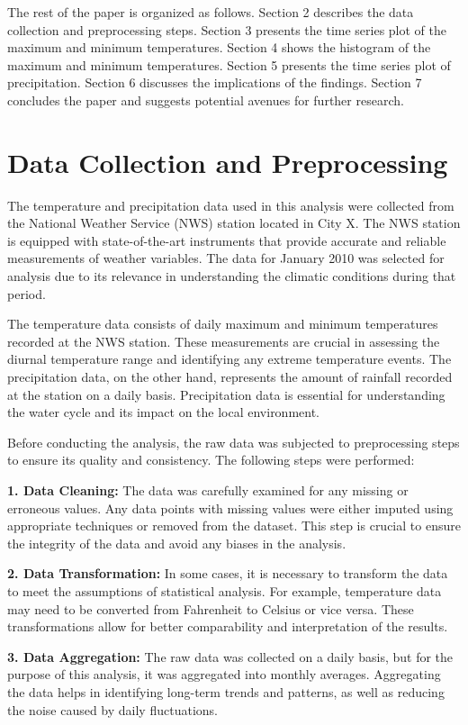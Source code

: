 \documentclass{article}
\begin{document}
The rest of the paper is organized as follows. Section 2 describes the data collection and preprocessing steps. Section 3 presents the time series plot of the maximum and minimum temperatures. Section 4 shows the histogram of the maximum and minimum temperatures. Section 5 presents the time series plot of precipitation. Section 6 discusses the implications of the findings. Section 7 concludes the paper and suggests potential avenues for further research.
\section{Data Collection and Preprocessing}

The temperature and precipitation data used in this analysis were collected from the National Weather Service (NWS) station located in City X. The NWS station is equipped with state-of-the-art instruments that provide accurate and reliable measurements of weather variables. The data for January 2010 was selected for analysis due to its relevance in understanding the climatic conditions during that period.

The temperature data consists of daily maximum and minimum temperatures recorded at the NWS station. These measurements are crucial in assessing the diurnal temperature range and identifying any extreme temperature events. The precipitation data, on the other hand, represents the amount of rainfall recorded at the station on a daily basis. Precipitation data is essential for understanding the water cycle and its impact on the local environment.

Before conducting the analysis, the raw data was subjected to preprocessing steps to ensure its quality and consistency. The following steps were performed:

\textbf{1. Data Cleaning:} The data was carefully examined for any missing or erroneous values. Any data points with missing values were either imputed using appropriate techniques or removed from the dataset. This step is crucial to ensure the integrity of the data and avoid any biases in the analysis.

\textbf{2. Data Transformation:} In some cases, it is necessary to transform the data to meet the assumptions of statistical analysis. For example, temperature data may need to be converted from Fahrenheit to Celsius or vice versa. These transformations allow for better comparability and interpretation of the results.

\textbf{3. Data Aggregation:} The raw data was collected on a daily basis, but for the purpose of this analysis, it was aggregated into monthly averages. Aggregating the data helps in identifying long-term trends and patterns, as well as reducing the noise caused by daily fluctuations.
\end{document}
